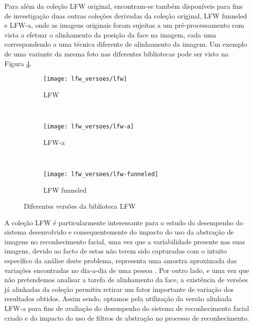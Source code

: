 Para além da coleção LFW original, encontram-se também disponíveis para fins de investigação duas outras coleções derivadas da coleção original, LFW funneled e LFW-a, onde as imagens originais foram sujeitas a um pré-processamento com vista a efetuar o alinhamento da posição da face na imagem, cada uma correspondendo a uma técnica diferente de alinhamento da imagem. Um exemplo de uma variante da mesma foto nas diferentes bibliotecas pode ser visto na Figura \ref{fig:lfwversoes}.

\begin{figure}[h]
        \centering
        \begin{subfigure}[b]{0.25\textwidth}
                \centering
                \texttt{[image: lfw\_versoes/lfw]}
                \caption{LFW}
                \label{fig:lfw_original}
        \end{subfigure}%
        ~ 
        \begin{subfigure}[b]{0.25\textwidth}
                \centering
                \texttt{[image: lfw\_versoes/lfw-a]}
                \caption{LFW-a}
                \label{fig:lfw_a}
        \end{subfigure}
        ~ 
        \begin{subfigure}[b]{0.25\textwidth}
                \centering
                \texttt{[image: lfw\_versoes/lfw-funneled]}
                \caption{LFW funneled}
                \label{fig:lfw_funneled}
        \end{subfigure}
        \caption{Diferentes versões da biblioteca LFW}\label{fig:lfwversoes}
\end{figure}

A coleção LFW é particularmente interessante para o estudo do desempenho do sistema desenvolvido e consequentemente do impacto do uso da abstração de imagens no reconhecimento facial, uma vez que a variabilidade presente nas suas imagens, devido ao facto de estas não terem sido capturadas com o intuito específico da análise deste problema, representa uma amostra aproximada das variações encontradas no dia-a-dia de uma pessoa \cite{Huang2007}. Por outro lado, e uma vez que não pretendemos analisar a tarefa de alinhamento da face, a existência de versões já alinhadas da coleção permitiu retirar um fator importante de variação dos resultados obtidos. Assim sendo, optamos pela utilização da versão alinhada LFW-a para fins de avaliação do desempenho do sistema de reconhecimento facial criado e do impacto do uso de filtros de abstração no processo de reconhecimento.

